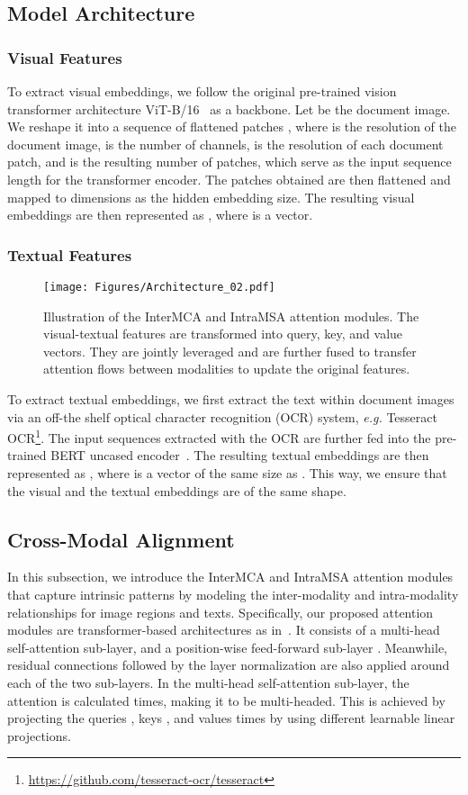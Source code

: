 \documentclass[preprint,review,12pt]{elsarticle}
\newcommand{\eg}{\textit{e.g. }}
\begin{document}
\subsection{Model Architecture}
\subsubsection{Visual Features}
To extract visual embeddings, we follow the original pre-trained vision transformer architecture ViT-B/16~\cite{dosovitskiy2021image} as a backbone. Let  be the document image. We reshape it into a sequence of flattened  patches , where  is the resolution of the document image,  is the number of channels,  is the resolution of each document patch, and  is the resulting number of patches, which serve as the input sequence length for the transformer encoder. The patches obtained are then flattened and mapped to  dimensions as the hidden embedding size. The resulting visual embeddings are then represented as , where  is a  vector.

\subsubsection{Textual Features}
\begin{figure*}[t!]
\centering
  \centerline{\texttt{[image: Figures/Architecture\_02.pdf]}}
\caption{Illustration of the InterMCA and IntraMSA attention modules. The visual-textual features are transformed into query, key, and value vectors. They are jointly leveraged and are further fused to transfer attention flows between modalities to update the original features.}
    \label{fig:Figure_02}
\end{figure*}
To extract textual embeddings, we first extract the text  within document images via an off-the shelf optical character recognition (OCR) system, \eg Tesseract OCR\footnote{\url{https://github.com/tesseract-ocr/tesseract}}. The input sequences extracted with the OCR are further fed into the pre-trained BERT uncased encoder~\cite{devlin2019bert}. The resulting textual embeddings are then represented as , where  is a  vector of the same size as . This way, we ensure that the visual and the textual embeddings are of the same shape.

\subsection{Cross-Modal Alignment}
In this subsection, we introduce the InterMCA and IntraMSA attention modules that capture intrinsic patterns by modeling the inter-modality and intra-modality relationships for image regions and texts. Specifically, our proposed attention modules are transformer-based architectures as in~\cite{vaswani2017attention}. It consists of a multi-head self-attention sub-layer, and a position-wise feed-forward sub-layer . Meanwhile, residual connections followed by the layer normalization  are also applied around each of the two sub-layers. In the multi-head self-attention sub-layer, the attention is calculated  times, making it to be multi-headed. This is achieved by projecting the queries , keys , and values   times by using different learnable linear projections. 
\end{document}
